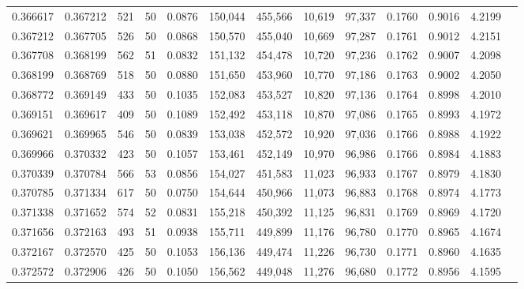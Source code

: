 \begin{tabular}{rrrrrrrrrrrrr}
0.366617 & 0.367212 &   521 &  50 &                                     0.0876 & 150,044 & 455,566 &  10,619 &  97,337 & 0.1760 & 0.9016 & 4.2199 \\
0.367212 & 0.367705 &   526 &  50 &                                     0.0868 & 150,570 & 455,040 &  10,669 &  97,287 & 0.1761 & 0.9012 & 4.2151 \\
0.367708 & 0.368199 &   562 &  51 &                                     0.0832 & 151,132 & 454,478 &  10,720 &  97,236 & 0.1762 & 0.9007 & 4.2098 \\
0.368199 & 0.368769 &   518 &  50 &                                     0.0880 & 151,650 & 453,960 &  10,770 &  97,186 & 0.1763 & 0.9002 & 4.2050 \\
0.368772 & 0.369149 &   433 &  50 &                                     0.1035 & 152,083 & 453,527 &  10,820 &  97,136 & 0.1764 & 0.8998 & 4.2010 \\
0.369151 & 0.369617 &   409 &  50 &                                     0.1089 & 152,492 & 453,118 &  10,870 &  97,086 & 0.1765 & 0.8993 & 4.1972 \\
0.369621 & 0.369965 &   546 &  50 &                                     0.0839 & 153,038 & 452,572 &  10,920 &  97,036 & 0.1766 & 0.8988 & 4.1922 \\
0.369966 & 0.370332 &   423 &  50 &                                     0.1057 & 153,461 & 452,149 &  10,970 &  96,986 & 0.1766 & 0.8984 & 4.1883 \\
0.370339 & 0.370784 &   566 &  53 &                                     0.0856 & 154,027 & 451,583 &  11,023 &  96,933 & 0.1767 & 0.8979 & 4.1830 \\
0.370785 & 0.371334 &   617 &  50 &                                     0.0750 & 154,644 & 450,966 &  11,073 &  96,883 & 0.1768 & 0.8974 & 4.1773 \\
0.371338 & 0.371652 &   574 &  52 &                                     0.0831 & 155,218 & 450,392 &  11,125 &  96,831 & 0.1769 & 0.8969 & 4.1720 \\
0.371656 & 0.372163 &   493 &  51 &                                     0.0938 & 155,711 & 449,899 &  11,176 &  96,780 & 0.1770 & 0.8965 & 4.1674 \\
0.372167 & 0.372570 &   425 &  50 &                                     0.1053 & 156,136 & 449,474 &  11,226 &  96,730 & 0.1771 & 0.8960 & 4.1635 \\
0.372572 & 0.372906 &   426 &  50 &                                     0.1050 & 156,562 & 449,048 &  11,276 &  96,680 & 0.1772 & 0.8956 & 4.1595 \\

\end{tabular}
